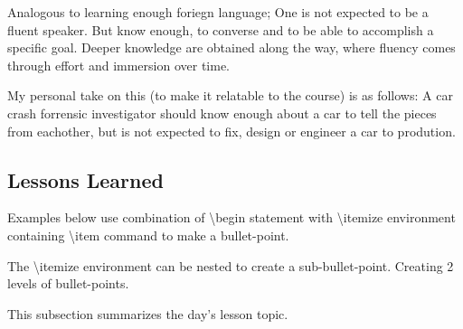 {Analogous to learning enough foriegn language; One is not expected to be a fluent speaker. But know enough, to converse and to be able to accomplish a specific goal. Deeper knowledge are obtained along the way, where fluency comes through effort and immersion over time. 

My personal take on this (to make it relatable to the course) is as follows: A car crash forrensic investigator should know enough about a car to tell the pieces from eachother, but is not expected to fix, design or engineer a car to prodution.



\subsection{Lessons Learned}\label{sec:lessons_learned}

\begin{notes}
    Examples below use combination of \textbackslash begin statement with \textbackslash itemize environment containing \textbackslash item command to make a bullet-point.
    
    The \textbackslash itemize environment can be nested to create a sub-bullet-point. Creating 2 levels of bullet-points.
\end{notes}

This subsection summarizes the day's lesson topic.

}
